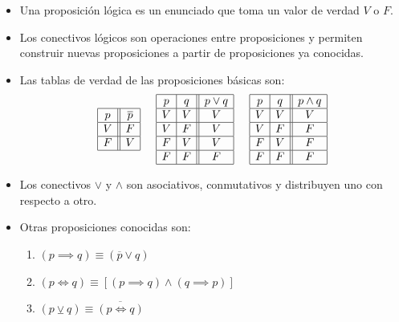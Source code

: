 \documentclass[letterpaper,11pt]{article}
\theoremstyle{plain}
\begin{document}
\begin{framed}
		\begin{multicols}{2}
			\begin{itemize}
			    \item Una proposición lógica es un enunciado que toma un valor de verdad $V$ o $F$.
				\item Los conectivos lógicos son operaciones entre proposiciones y permiten construir nuevas proposiciones a partir de proposiciones ya conocidas.
				\item Las tablas de verdad de las proposiciones básicas son:
				$$
				\begin{array}{|c||c|}
				\hline p &  \overline p \\ 
				\hline V & F \\ 
				\hline F & V \\ 
				\hline 
				\end{array} \hspace{5 mm}\begin{array}{|c|c||c|}
				\hline p & q & p \vee q \\ 
				\hline V & V & V \\ 
				\hline V & F & V \\ 
				\hline F & V & V \\ 
				\hline F & F & F \\ 
				\hline 
				\end{array} \hspace{5 mm}\begin{array}{|c|c||c|}
				\hline p & q & p \wedge q \\ 
				\hline V & V & V \\ 
				\hline V & F & F \\ 
				\hline F & V & F \\ 
				\hline F & F & F \\ 
				\hline 
				\end{array} 
				$$
				\item Los conectivos $\vee$ y $\wedge$ son asociativos, conmutativos y distribuyen uno con respecto a otro. 
				\item Otras proposiciones conocidas son:
				\begin{enumerate}
					\item $(p \implies q ) \equiv (\overline{p} \vee q)$
					\item $(p \iff q) \equiv [(p \implies q ) \wedge (q \implies p)]$
					\item $(p \veebar q ) \equiv \overline{(p \iff q)}$
				\end{enumerate}

\end{itemize}
\end{multicols}
\end{framed}
\end{document}
